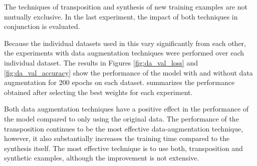 
The techniques of transposition and synthesis of new
training examples are not mutually exclusive. In the last
experiment, the impact of both techniques in conjunction is
evaluated.

Because the individual datasets used in this \thesisdiss{}
vary significantly from each other, the experiments with
data augmentation techniques were performed over each
individual dataset. The results in Figures
\ref{fig:da_val_loss} and \ref{fig:da_val_accuracy} show the
performance of the model with and without data augmentation
for 200 epochs on each dataset. 
summarizes the performance obtained after selecting the best
weights for each experiment.




 Both data augmentation techniques have a positive effect in
 the performance of the model compared to only using the
 original data. The performance of the transposition
 continues to be the most effective data-augmentation
 technique, however, it also substantially increases the
 training time compared to the synthesis itself. The most
 effective technique is to use both, transposition and
 synthetic examples, although the improvement is not
 extensive.
